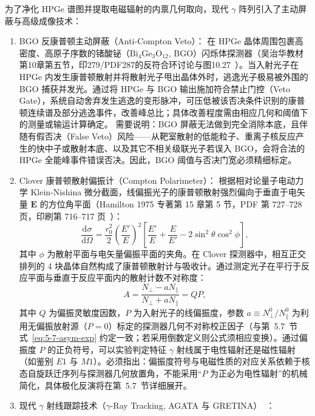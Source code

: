 为了净化 HPGe 谱图并提取电磁辐射的内禀几何取向，现代 $\gamma$ 阵列引入了主动屏蔽与高级成像技术：
\begin{enumerate}
\item BGO 反康普顿主动屏蔽（Anti-Compton Veto）：
在 HPGe 晶体周围包裹高密度、高原子序数的锗酸铋（$\mathrm{Bi}_4\mathrm{Ge}_3\mathrm{O}_{12}$, BGO）闪烁体探测器（吴治华教材第10章第五节，印279/PDF287的反符合环讨论与图10.27~\cite{book-wu-nuclear-experiment-methods}）。当入射光子在 HPGe 内发生康普顿散射并将散射光子甩出晶体外时，逃逸光子极易被外围的 BGO 捕获并发光。通过将 HPGe 与 BGO 输出施加符合禁止门控（Veto Gate），系统自动舍弃发生逃逸的变形脉冲，可压低被该否决条件识别的康普顿连续谱及部分逃逸事件，改善峰总比；具体改善程度需由相应几何和阈值下的测量或输运计算确定。
需要说明：BGO 屏蔽无法做到完全消除本底，且伴随有假否决（False Veto）风险——从靶室散射的低能粒子、重离子核反应产生的快中子或散射本底、以及其它不相关级联光子若误入 BGO，会将合法的 HPGe 全能峰事件错误否决。因此，BGO 阈值与否决门宽必须精细标定。
\item Clover 康普顿散射偏振计（Compton Polarimeter）：
根据相对论量子电动力学 Klein-Nishina 微分截面，线偏振光子的康普顿散射强烈偏向于垂直于电矢量 $\mathbf{E}$ 的方位角平面（Hamilton 1975 专著第 15 章第 5 节，PDF 第 727–728 页，印刷第 716–717 页~\cite{book-hamilton-electromagnetic-interaction}）：
\begin{equation}\label{eq:5-2-klein-nishina-pol}
\frac{\mathrm{d}\sigma}{\mathrm{d}\Omega} = \frac{r_0^2}{2} \left(\frac{E'}{E}\right)^2 \left[ \frac{E'}{E} + \frac{E}{E'} - 2\sin^2\theta \cos^2\phi \right],
\end{equation}
其中 $\phi$ 为散射平面与电矢量偏振平面的夹角。在 Clover 探测器中，相互正交排列的 4 块晶体自然构成了康普顿散射计与吸收计。通过测定光子在平行于反应平面与垂直于反应平面内的散射计数不对称度：
\begin{equation}\label{eq:5-2-asymmetry}
A = \frac{N_\perp - a N_\parallel}{N_\perp + a N_\parallel} = Q P,
\end{equation}
其中 $Q$ 为偏振灵敏度因数，$P$ 为入射光子的线偏振度，参数 $a \equiv N_\perp^0 / N_\parallel^0$ 为利用无偏振放射源（$P=0$）标定的探测器几何不对称校正因子（与第~5.7~节式~\eqref{eq:5-7-asym-exp} 约定一致；若采用倒数定义则公式须相应变换）。通过偏振度 $P$ 的正负符号，可以实验判定特征 $\gamma$ 射线属于电性辐射还是磁性辐射（如鉴别 $E1$ 与 $M1$）。必须指出：偏振度符号与电磁性质的对应关系依赖于核态自旋跃迁序列与探测器几何放置角，不能采用“$P$ 为正必为电性辐射”的机械简化，具体极化反演将在第~5.7~节详细展开。
\item 现代 $\gamma$ 射线跟踪技术（$\gamma$-Ray Tracking, AGATA 与 GRETINA）~\cite{akkoyun-2012-agata-instrument-response}：

\end{enumerate}
